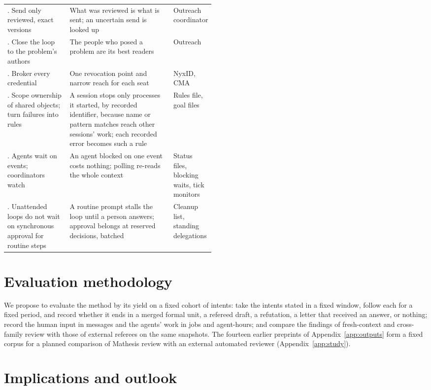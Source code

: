 \documentclass[11pt]{article}
\begin{document}
\begin{table}[htbp]
\begin{tabularx}{\linewidth}{@{}>{\raggedright\arraybackslash}p{0.3\linewidth}>{\raggedright\arraybackslash}X>{\raggedright\arraybackslash}p{0.19\linewidth}@{}}
13. Send only reviewed, exact versions & What was reviewed is what is sent; an uncertain send is looked up & Outreach coordinator \\
14. Close the loop to the problem's authors & The people who posed a problem are its best readers & Outreach \\
15. Broker every credential & One revocation point and narrow reach for each seat & NyxID, CMA \\
16. Scope ownership of shared objects; turn failures into rules & A session stops only processes it started, by recorded identifier, because name or pattern matches reach other sessions' work; each recorded error becomes such a rule & Rules file, goal files \\
17. Agents wait on events; coordinators watch & An agent blocked on one event costs nothing; polling re-reads the whole context & Status files, blocking waits, tick monitors \\
18. Unattended loops do not wait on synchronous approval for routine steps & A routine prompt stalls the loop until a person answers; approval belongs at reserved decisions, batched & Cleanup list, standing delegations \\
\bottomrule
\end{tabularx}
\end{table}

\section{Evaluation methodology}
\label{sec:evaluate}
We propose to evaluate the method by its yield on a fixed cohort of intents:
take the intents stated in a fixed window, follow each for a fixed period, and
record whether it ends in a merged formal unit, a refereed draft, a
refutation, a letter that received an answer, or nothing; record the human
input in messages and the agents' work in jobs and agent-hours; and compare
the findings of fresh-context and cross-family review with those of external
referees on the same snapshots. The fourteen earlier preprints of
Appendix~\ref{app:outputs} form a fixed corpus for a planned comparison of
Mathesis review with an external automated reviewer
(Appendix~\ref{app:study}).

\section{Implications and outlook}
\label{sec:outlook}
\end{document}
